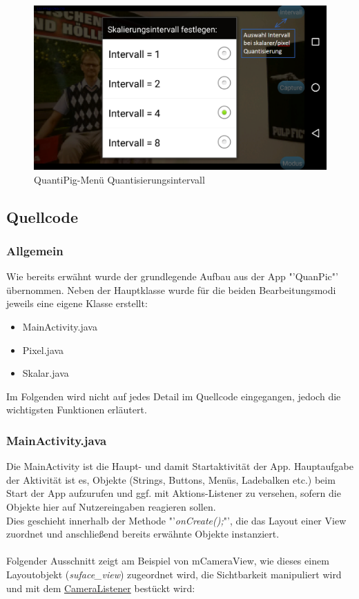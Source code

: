 \begin{description}
\begin{figure}[h!]
	\centering
		\includegraphics[width=1.0\textwidth]{img/Intervall_QuantiPig.png}
	\caption[QuantiPig-Menü Quantisierungsintervall]{QuantiPig-Menü Quantisierungsintervall}
	\label{fig:pig_intervall}
\end{figure}


\clearpage

\newpage
\subsection{Quellcode}
\subsubsection{Allgemein}

Wie bereits erwähnt wurde der grundlegende Aufbau aus der App "'QuanPic"' übernommen. Neben der Hauptklasse wurde für die beiden Bearbeitungsmodi jeweils eine eigene Klasse erstellt:
\begin{itemize}
	\item MainActivity.java
	\item Pixel.java
	\item Skalar.java
\end{itemize}
Im Folgenden wird nicht auf jedes Detail im Quellcode eingegangen, jedoch die wichtigsten Funktionen erläutert.

\subsubsection{MainActivity.java}
\label{mainactivity}

Die MainActivity ist die Haupt- und damit Startaktivität der App. Hauptaufgabe der Aktivität ist es, Objekte  (Strings, Buttons, Menüs, Ladebalken etc.) beim Start der App aufzurufen und ggf. mit Aktions-Listener zu versehen, sofern die Objekte hier auf Nutzereingaben reagieren sollen. \\
Dies geschieht innerhalb der Methode "'\textit{onCreate();}"', die das Layout einer View zuordnet und anschließend bereits erwähnte Objekte instanziert. \\
\\
Folgender Ausschnitt zeigt am Beispiel von mCameraView, wie dieses einem Layoutobjekt (\textcolor{lila}{\textit{suface\_view}})  zugeordnet wird, die Sichtbarkeit manipuliert wird und mit dem \hyperref[CameraListener]{CameraListener}  bestückt wird:


\end{description}
